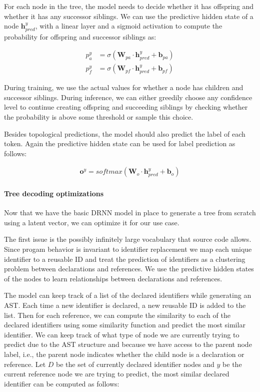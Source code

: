 For each node in the tree, the model needs to decide whether it has offspring and whether it has any successor siblings. We can use the predictive hidden state of a node $\mathbf{h}^y_{pred}$, with a linear layer and a sigmoid activation to compute the probability for offspring and successor siblings as:

\begin{align}
    p_a^y &= \sigma(\mathbf{W}_{pa} \cdot \mathbf{h}_{pred}^y + \mathbf{b}_{pa}) \label{eq:prob_ancestral} \\
    p_f^y &= \sigma(\mathbf{W}_{pf} \cdot \mathbf{h}_{pred}^y + \mathbf{b}_{pf})\label{eq:prob_fraternal}
\end{align}

During training, we use the actual values for whether a node has children and successor siblings. 
During inference, we can either greedily choose any confidence level to continue creating offspring and succeeding siblings by checking whether the probability is above some threshold or sample this choice. 



Besides topological predictions, the model should also predict the label of each token. Again the predictive hidden state can be used for label prediction as follows:

\begin{align}
    \mathbf{o}^y =  softmax\left(\mathbf{W}_o \cdot \mathbf{h}_{pred}^y + \mathbf{b}_{o}\right) \label{eq:label_pred}
\end{align}


\paragraph{Tree decoding optimizations} Now that we have the basic DRNN model \cite{alvarezmelis2017tree} in place to generate a tree from scratch using a latent vector, we can optimize it for our use case. 



The first issue is the possibly infinitely large vocabulary that source code allows. Since progam behavior is invariant to identifier replacement we map each unique identifier to a reusable ID \cite{tufano2019learning} and treat the prediction of identifiers as a clustering problem between declarations and references. We use the predictive hidden states of the nodes to learn relationships between declarations and references.  



The model can keep track of a list of the declared identifiers while generating an AST. Each time a new identifier is declared, a new reusable ID is added to the list. Then for each reference, we can compute the similarity to each of the declared identifiers using some similarity function and predict the most similar identifier. We can keep track of what type of node we are currently trying to predict due to the AST structure and because we have access to the parent node label, i.e., the parent node indicates whether the child node is a declaration or reference. Let $D$ be the set of currently declared identifier nodes and $y$ be the current reference node we are trying to predict, the most similar declared identifier can be computed as follows:

